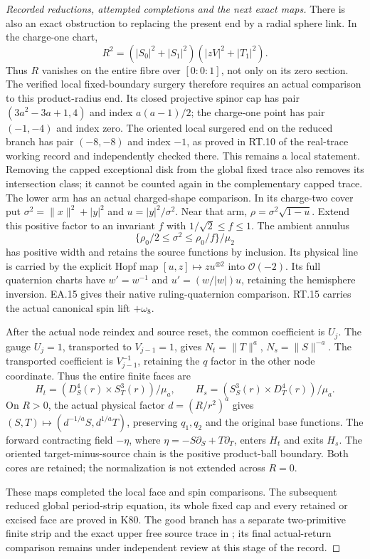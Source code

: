 \begin{proof}[Recorded reductions, attempted completions and the next exact maps]
There is also an exact obstruction to replacing the present
end by a radial sphere link. In the charge-one chart,
\[
 R^2=(|S_0|^2+|S_1|^2)(|zV|^2+|T_1|^2).
\]
Thus \(R\) vanishes on the entire fibre over
\([0:0:1]\), not only on its zero section. The verified
local fixed-boundary surgery therefore requires an actual
comparison to this product-radius end. Its closed
projective spinor cap has pair
\((3a^2-3a+1,4)\) and index \(a(a-1)/2\);
the charge-one point has pair \((-1,-4)\) and index zero.
The oriented local surgered end on the reduced branch
has pair \((-8,-8)\) and index \(-1\), as proved in
RT.10 of the real-trace working record and independently
checked there. This remains a local statement. Removing
the capped exceptional disk from the global fixed trace
also removes its intersection class; it cannot be counted
again in the complementary capped trace. The lower arm has an actual charged-shape comparison. In its
charge-two cover put \(\sigma^2=\|x\|^2+|y|^2\) and
\(u=|y|^2/\sigma^2\). Near that arm,
\(\rho=\sigma^2\sqrt{1-u}\). Extend this positive factor
to an invariant \(f\) with \(1/\sqrt2\le f\le1\).
The ambient annulus
\[
 \{\rho_0/2\le\sigma^2\le\rho_0/f\}/\mu_2
\]
has positive width and retains the source functions by inclusion.
Its physical line is carried by the explicit Hopf map
\([u,z]\mapsto z u^{\otimes2}\) into \(\mathcal O(-2)\).
Its full quaternion charts have \(w'=w^{-1}\) and
\(u'=(w/|w|)u\), retaining the hemisphere inversion.
EA.15 gives their native ruling-quaternion comparison.
RT.15 carries the actual canonical spin lift \(+\omega_8\).

After the actual node reindex and source reset, the common
coefficient is \(U_j\). The gauge \(U_j=1\), transported to
\(V_{j-1}=1\), gives \(N_t=\|T\|^a\), \(N_s=\|S\|^{-a}\).
The transported coefficient is \(V_{j-1}^{-1}\), retaining
the \(q\) factor in the other node coordinate. Thus the entire
finite faces are
\[
 H_t=(D^4_S(r)\times S^3_T(r))/\mu_a,\qquad
 H_s=(S^3_S(r)\times D^4_T(r))/\mu_a.
\]
On \(R>0\), the actual physical factor \(d=(R/r^2)^a\)
gives \((S,T)\mapsto(d^{-1/a}S,d^{1/a}T)\), preserving
\(q_1,q_2\) and the original base functions.
The forward contracting field \(-\eta\), where
\(\eta=-S\partial_S+T\partial_T\), enters \(H_t\) and
exits \(H_s\). The oriented target-minus-source chain is
the positive product-ball boundary. Both cores are retained;
the normalization is not extended across \(R=0\).

These maps completed the local face and spin comparisons.
The subsequent reduced global period-strip equation, its whole
fixed cap and every retained or excised face are proved in K80.
The good branch has a separate two-primitive finite strip and
the exact upper free source trace in
; its final
actual-return comparison remains under independent review at
this stage of the record.


\end{proof}
